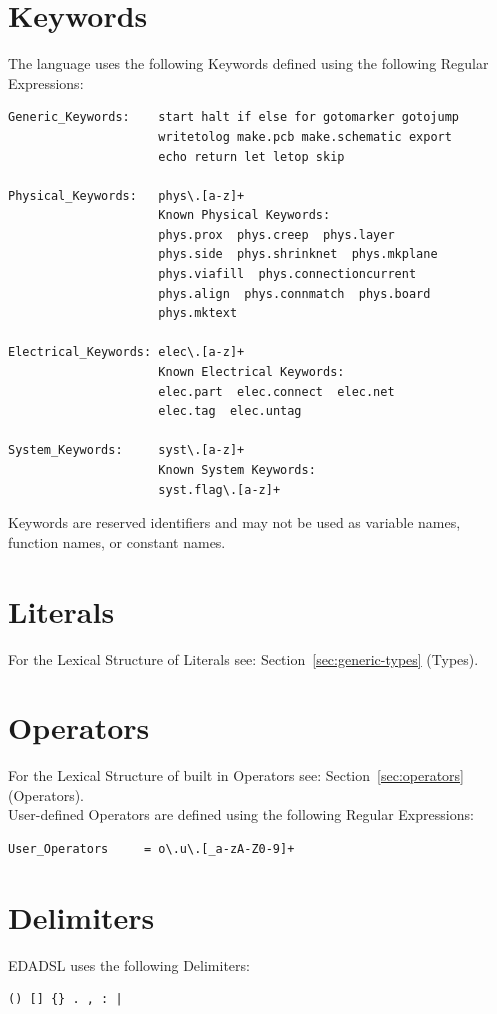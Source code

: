 \documentclass{report}
\begin{document}
\section{Keywords}
The language uses the following Keywords defined using the following Regular Expressions:
\begin{verbatim}
Generic_Keywords:    start halt if else for gotomarker gotojump 
                     writetolog make.pcb make.schematic export 
                     echo return let letop skip

Physical_Keywords:   phys\.[a-z]+
                     Known Physical Keywords:
                     phys.prox  phys.creep  phys.layer
                     phys.side  phys.shrinknet  phys.mkplane
                     phys.viafill  phys.connectioncurrent
                     phys.align  phys.connmatch  phys.board
                     phys.mktext

Electrical_Keywords: elec\.[a-z]+
                     Known Electrical Keywords:
                     elec.part  elec.connect  elec.net
                     elec.tag  elec.untag

System_Keywords:     syst\.[a-z]+
                     Known System Keywords:
                     syst.flag\.[a-z]+
\end{verbatim}
Keywords are reserved identifiers and may not be used as variable names, function names, or constant names.

\section{Literals}
For the Lexical Structure of Literals see:  Section~\ref{sec:generic-types} (Types).

\section{Operators}
For the Lexical Structure of built in Operators see:  Section~\ref{sec:operators} (Operators). \\
User-defined Operators are defined using the following Regular Expressions:
\begin{verbatim}
User_Operators     = o\.u\.[_a-zA-Z0-9]+
\end{verbatim}

\section{Delimiters}
EDADSL uses the following Delimiters:
\begin{verbatim}
() [] {} . , : |
\end{verbatim}
\end{document}
